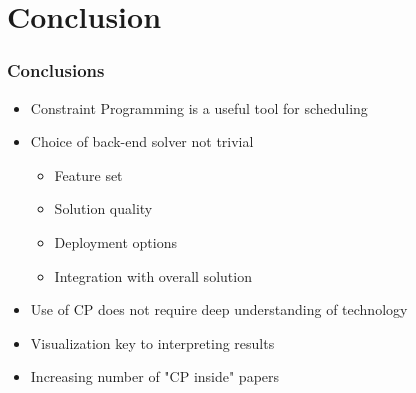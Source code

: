 \section{Conclusion}

\begin{frame}
\frametitle{Conclusions}
\begin{itemize}
\item Constraint Programming is a useful tool for scheduling
\item Choice of back-end solver not trivial
\begin{itemize}
\item Feature set
\item Solution quality
\item Deployment options
\item Integration with overall solution
\end{itemize}
\item Use of CP does not require deep understanding of technology
\item Visualization key to interpreting results
\item Increasing number of "CP inside" papers
\end{itemize}
\end{frame}


